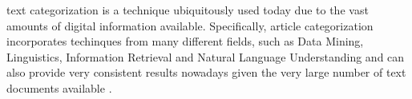 \documentclass[10pt,journal,compsoc]{IEEEtran}
\begin{document}
%



 text categorization is a technique 
ubiquitously used today due to the vast amounts of digital 
information available.
Specifically, article categorization incorporates techinques from
many different fields, such as Data Mining, Linguistics, Information
Retrieval and Natural Language Understanding and can also provide 
very consistent results nowadays given the very large number of text 
documents available \cite{a5}.
\end{document}
